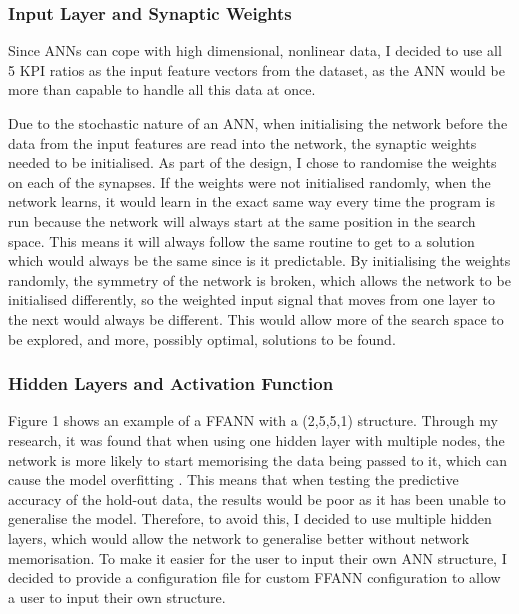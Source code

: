 \documentclass[11pt]{article}
\begin{document}
\subsubsection{Input Layer and Synaptic Weights}\label{subsubsec:inputLayer}
Since ANNs can cope with high dimensional, nonlinear data, I decided to use all 5 KPI ratios as the input feature vectors from the dataset, as the ANN would be more than capable to handle all this data at once.

Due to the stochastic nature of an ANN, when initialising the network before the data from the input features are read into the network, the synaptic weights needed to be initialised. As part of the design, I chose to randomise the weights on each of the synapses. If the weights were not initialised randomly, when the network learns, it would learn in the exact same way every time the program is run because the network will always start at the same position in the search space. This means it will always follow the same routine to get to a solution which would always be the same since is it predictable.  By initialising the weights randomly, the symmetry of the network is broken, which allows the network to be initialised differently, so the weighted input signal that moves from one layer to the next would always be different. This would allow more of the search space to be explored, and more, possibly optimal, solutions to be found.
\subsubsection{Hidden Layers and Activation Function}\label{subsubsec:hiddenL}%
Figure 1 shows an example of a FFANN with a (2,5,5,1) structure. Through my research, it was found that when using one hidden layer with multiple nodes, the network is more likely to start memorising the data being passed to it, which can cause the model overfitting \cite{ref-nine}. This means that when testing the predictive accuracy of the hold-out data, the results would be poor as it has been unable to generalise the model. Therefore, to avoid this, I decided to use multiple hidden layers, which would allow the network to generalise better without network memorisation.  To make it easier for the user to input their own ANN structure, I decided to provide a configuration file for custom FFANN configuration to allow a user to input their own structure. 
\end{document}
